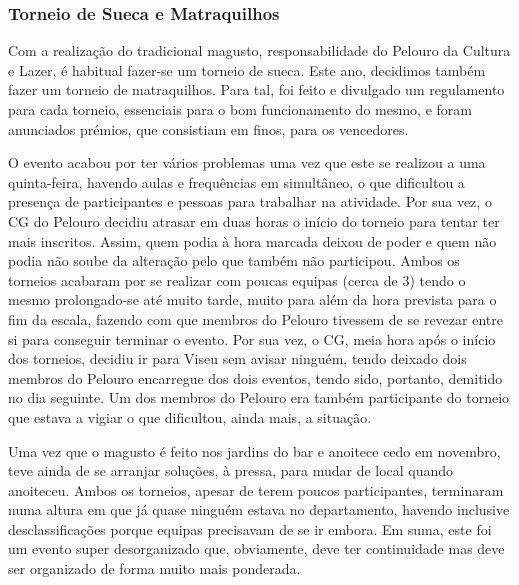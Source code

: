 
\subsubsection{Torneio de Sueca e Matraquilhos}

Com a realização do tradicional magusto, responsabilidade do Pelouro da Cultura e Lazer, é habitual fazer-se um torneio de sueca. Este ano, decidimos também fazer um torneio de matraquilhos. Para tal, foi feito e divulgado um regulamento para cada torneio, essenciais para o bom funcionamento do mesmo, e foram anunciados prémios, que consistiam em finos, para os vencedores.

O evento acabou por ter vários problemas uma vez que este se realizou a uma quinta-feira, havendo aulas e frequências em simultâneo, o que dificultou a presença de participantes e pessoas para trabalhar na atividade. Por sua vez, o CG do Pelouro decidiu atrasar em duas horas o início do torneio para tentar ter mais inscritos. Assim, quem podia à hora marcada deixou de poder e quem não podia não soube da alteração pelo que também não participou. Ambos os torneios acabaram por se realizar com poucas equipas (cerca de 3) tendo o mesmo prolongado-se até muito tarde, muito para além da hora prevista para o fim da escala, fazendo com que membros do Pelouro tivessem de se revezar entre si para conseguir terminar o evento. Por sua vez, o CG, meia hora após o início dos torneios, decidiu ir para Viseu sem avisar ninguém, tendo deixado dois membros do Pelouro encarregue dos dois eventos, tendo sido, portanto, demitido no dia seguinte. Um dos membros do Pelouro era também participante do torneio que estava a vigiar o que dificultou, ainda mais, a situação.

Uma vez que o magusto é feito nos jardins do bar e anoitece cedo em novembro, teve ainda de se arranjar soluções, à pressa, para mudar de local quando anoiteceu. Ambos os torneios, apesar de terem poucos participantes, terminaram numa altura em que já quase ninguém estava no departamento, havendo inclusive desclassificações porque equipas precisavam de se ir embora. Em suma, este foi um evento super desorganizado que, obviamente, deve ter continuidade mas deve ser organizado de forma muito mais ponderada.
